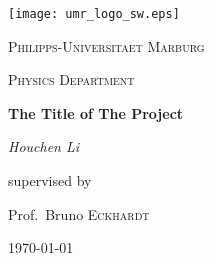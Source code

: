 \begin{titlepage}
	\centering
	\texttt{[image: umr\_logo\_sw.eps]}\par\vspace{1cm}
	{\scshape\LARGE Philipps-Universitaet Marburg\par}
	\vspace{1cm}
	{\scshape\Large Physics Department\par}
	\vspace{1.5cm}
	{\huge\bfseries The Title of The Project\par}
	\vspace{2cm}
	{\Large\itshape Houchen Li\par}
	\vfill
	supervised by\par
	Prof.~Bruno \textsc{Eckhardt}
		
	\vfill

	{\large \today\par}


\end{titlepage}
